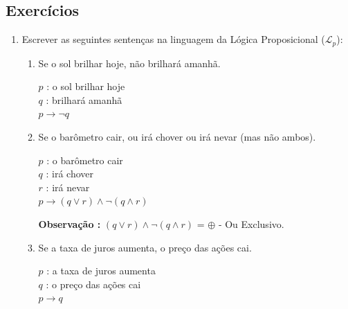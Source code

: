     \subsection{Exercícios}
        \begin{enumerate}[label=\arabic*., left=0.5cm, align=left, nosep]
            \item Escrever as seguintes sentenças na linguagem da Lógica Proposicional ($\mathcal{L}_p$):

                \begin{enumerate}[label=(\alph*), left=0.5cm, align=left, nosep]
                    
                    \item Se o sol brilhar hoje, não brilhará amanhã.
                    \begin{center}
                        $p$ : o sol brilhar hoje \\
                        $q$ : brilhará amanhã \\
                        $p \rightarrow \neg q$     
                    \end{center}
                    
                    \item Se o barômetro cair, ou irá chover ou irá nevar (mas não ambos).
                    \begin{center}
                        $p$ : o barômetro cair \\
                        $q$ : irá chover \\
                        $r$ : irá nevar \\
                        $p \rightarrow (q \lor r) \land \neg(q \land r)$
                    \end{center}

                    \textbf{Observação :} $(q \lor r) \land \neg(q \land r)$ = $\oplus$ - Ou Exclusivo.
                    
                    \item Se a taxa de juros aumenta, o preço das ações cai.
                    \begin{center}
                        $p$ : a taxa de juros aumenta \\
                        $q$ : o preço das ações cai \\
                        $p \rightarrow q$ 
                    \end{center}    
                    

\end{enumerate}
\end{enumerate}
